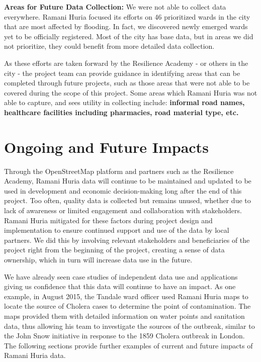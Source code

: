 \documentclass[a4paper,12pt,twoside]{article}
\begin{document}
\begin{multicols}{2}
\textbf{Areas for Future Data Collection:}
We were not able to collect data everywhere. Ramani Huria focused its efforts on 46 prioritized wards in the city that are most affected by flooding. In fact, we discovered newly emerged wards yet to be officially registered. Most of the city has base data,  but in areas we did not prioritize, they could  benefit from more detailed data collection.  

As these efforts are taken forward by the Resilience Academy - or others in the city -  the project team can provide guidance in identifying areas that can be completed through future projects, such as those areas that were not able to be covered during the scope of this project. Some areas which Ramani Huria was not able to capture, and sees utility in collecting include: \textbf{informal road names, healthcare facilities including pharmacies, road material type, etc.} 
\end{multicols}

\newpage
\section{Ongoing and Future Impacts}
\begin{multicols}{2}
Through the OpenStreetMap platform and partners such as the Resilience Academy, Ramani Huria data will continue to be maintained and updated to be used in development and economic decision-making long after the end of this project. Too often, quality data is collected but remains unused, whether due to lack of awareness or limited engagement and collaboration with stakeholders. Ramani Huria mitigated for these factors during project design and implementation to ensure continued support and use of the data by local partners. We did this by involving relevant stakeholders and beneficiaries of the project right from the beginning of the project, creating a sense of data ownership, which in turn will increase data use in the future.

We have already seen case studies of independent data use and applications giving us confidence that this data will continue to have an impact. As one example, in August 2015, the Tandale ward officer used Ramani Huria maps to locate the source of Cholera cases to determine the point of contamination. The maps provided them with detailed information on water points and sanitation data, thus allowing his team to investigate the sources of the outbreak, similar to the John Snow initiative in response to the 1859 Cholera outbreak in London. The following sections provide further examples of current and future impacts of Ramani Huria data. 
\end{multicols}
\end{document}
